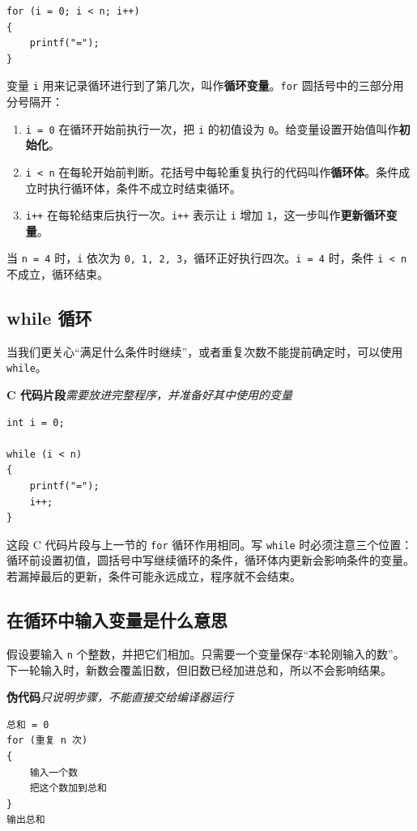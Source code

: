 \documentclass[UTF8,zihao=-4,fontset=windows]{ctexart}
\newcommand{\term}[1]{\textbf{\color{navy}#1}}
\newcommand{\pseudolabel}{\noindent\textbf{伪代码}\quad\textit{只说明步骤，不能直接交给编译器运行}\par\nopagebreak}
\newcommand{\cfragmentlabel}{\noindent\textbf{C 代码片段}\quad\textit{需要放进完整程序，并准备好其中使用的变量}\par\nopagebreak}
\begin{document}
\begin{lstlisting}[style=cstyle]
for (i = 0; i < n; i++)
{
    printf("=");
}
\end{lstlisting}

变量 \verb|i| 用来记录循环进行到了第几次，叫作\term{循环变量}。\verb|for| 圆括号中的三部分用分号隔开：
\begin{enumerate}
  \item \verb|i = 0| 在循环开始前执行一次，把 \verb|i| 的初值设为 \verb|0|。给变量设置开始值叫作\term{初始化}。
  \item \verb|i < n| 在每轮开始前判断。花括号中每轮重复执行的代码叫作\term{循环体}。条件成立时执行循环体，条件不成立时结束循环。
  \item \verb|i++| 在每轮结束后执行一次。\verb|i++| 表示让 \verb|i| 增加 \verb|1|，这一步叫作\term{更新循环变量}。
\end{enumerate}

当 \verb|n = 4| 时，\verb|i| 依次为 \verb|0, 1, 2, 3|，循环正好执行四次。\verb|i = 4| 时，条件 \verb|i < n| 不成立，循环结束。

\subsection{while 循环}

当我们更关心“满足什么条件时继续”，或者重复次数不能提前确定时，可以使用 \verb|while|。

\cfragmentlabel
\begin{lstlisting}[style=cstyle]
int i = 0;

while (i < n)
{
    printf("=");
    i++;
}
\end{lstlisting}

这段 C 代码片段与上一节的 \verb|for| 循环作用相同。写 \verb|while| 时必须注意三个位置：循环前设置初值，圆括号中写继续循环的条件，循环体内更新会影响条件的变量。若漏掉最后的更新，条件可能永远成立，程序就不会结束。

\subsection{在循环中输入变量是什么意思}

假设要输入 \verb|n| 个整数，并把它们相加。只需要一个变量保存“本轮刚输入的数”。下一轮输入时，新数会覆盖旧数，但旧数已经加进总和，所以不会影响结果。

\pseudolabel
\begin{lstlisting}[style=pseudostyle]
总和 = 0
for (重复 n 次)
{
    输入一个数
    把这个数加到总和
}
输出总和
\end{lstlisting}
\end{document}
